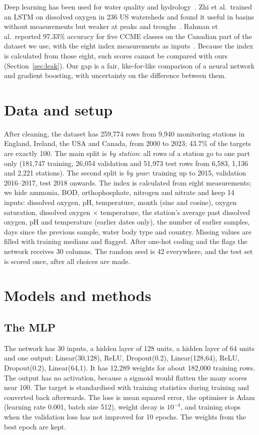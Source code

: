 \documentclass[conference]{IEEEtran}
\begin{document}
Deep learning has been used for water quality and hydrology~\cite{sit2020}. Zhi et al.\ trained an LSTM on dissolved oxygen in 236 US watersheds and found it useful in basins without measurements but weaker at peaks and troughs~\cite{zhi2021}. Rahman et al.\ reported 97.33\% accuracy for five CCME classes on the Canadian part of the dataset we use, with the eight index measurements as inputs~\cite{rahman2026}. Because the index is calculated from those eight, such scores cannot be compared with ours (Section~\ref{sec:leak}). Our gap is a fair, like-for-like comparison of a neural network and gradient boosting, with uncertainty on the difference between them.

\section{Data and setup}
After cleaning, the dataset has 259,774 rows from 9,940 monitoring stations in England, Ireland, the USA and Canada, from 2000 to 2023; 43.7\% of the targets are exactly 100. The main split is \emph{by station}: all rows of a station go to one part only (181,747 training, 26,054 validation and 51,973 test rows from 6,583, 1,136 and 2,221 stations). The second split is \emph{by year}: training up to 2015, validation 2016--2017, test 2018 onwards. The index is calculated from eight measurements; we hide ammonia, BOD, orthophosphate, nitrogen and nitrate and keep 14 inputs: dissolved oxygen, pH, temperature, month (sine and cosine), oxygen saturation, dissolved oxygen $\times$ temperature, the station's average past dissolved oxygen, pH and temperature (earlier dates only), the number of earlier samples, days since the previous sample, water body type and country. Missing values are filled with training medians and flagged. After one-hot coding and the flags the network receives 30 columns. The random seed is 42 everywhere, and the test set is scored once, after all choices are made.

\section{Models and methods}
\subsection{The MLP}
The network has 30 inputs, a hidden layer of 128 units, a hidden layer of 64 units and one output: Linear(30,128), ReLU, Dropout(0.2), Linear(128,64), ReLU, Dropout(0.2), Linear(64,1). It has 12,289 weights for about 182,000 training rows. The output has no activation, because a sigmoid would flatten the many scores near 100. The target is standardised with training statistics during training and converted back afterwards. The loss is mean squared error, the optimiser is Adam (learning rate 0.001, batch size 512), weight decay is $10^{-4}$, and training stops when the validation loss has not improved for 10 epochs. The weights from the best epoch are kept.
\end{document}

